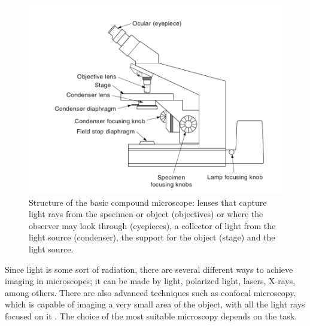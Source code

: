 \begin{figure}[H]
	\centering
	\caption{\label{fig:compound_microscope} Structure of the basic compound microscope: lenses that capture light rays from the specimen or object (objectives) or where the observer may look through (eyepieces), a collector of light from the light source (condenser), the support for the object (stage) and the light source.}
	\begin{center}
	    \includegraphics[scale=0.4]{images/fig5.png}
	\end{center}
	\centering
\end{figure}

Since light is some sort of radiation, there are several different ways to achieve imaging in microscopes; it can be made by light, polarized light, lasers, X-rays, among others. There are also advanced techniques such as confocal microscopy, which is capable of imaging a very small area of the object, with all the light rays focused on it \cite{rochow1994introduction}. The choice of the most suitable microscopy depends on the task.

